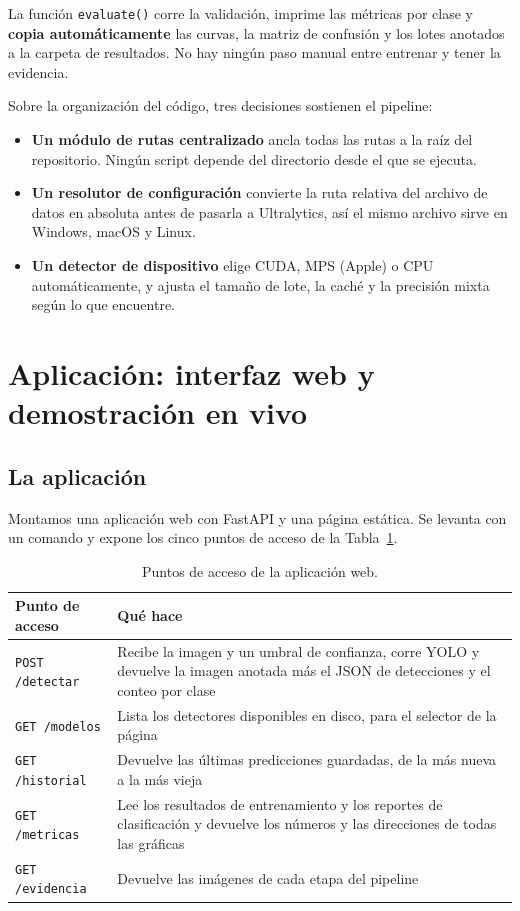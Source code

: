 \documentclass[11pt,a4paper]{article}
\begin{document}
La función \texttt{evaluate()} corre la validación, imprime las métricas por clase y \textbf{copia
automáticamente} las curvas, la matriz de confusión y los lotes anotados a la carpeta de
resultados. No hay ningún paso manual entre entrenar y tener la evidencia.

Sobre la organización del código, tres decisiones sostienen el pipeline:

\begin{itemize}
  \item \textbf{Un módulo de rutas centralizado} ancla todas las rutas a la raíz del repositorio.
        Ningún script depende del directorio desde el que se ejecuta.
  \item \textbf{Un resolutor de configuración} convierte la ruta relativa del archivo de datos en
        absoluta antes de pasarla a Ultralytics, así el mismo archivo sirve en Windows, macOS y
        Linux.
  \item \textbf{Un detector de dispositivo} elige CUDA, MPS (Apple) o CPU automáticamente, y ajusta
        el tamaño de lote, la caché y la precisión mixta según lo que encuentre.
\end{itemize}

\section{Aplicación: interfaz web y demostración en vivo}
\label{sec:aplicacion}

\subsection{La aplicación}

Montamos una aplicación web con FastAPI y una página estática. Se levanta con un comando y expone
los cinco puntos de acceso de la Tabla~\ref{tab:endpoints}.

\begin{table}[htbp]
\centering
\caption{Puntos de acceso de la aplicación web.}
\label{tab:endpoints}
\small
\begin{tabularx}{\textwidth}{@{}l X@{}}
\toprule
\textbf{Punto de acceso} & \textbf{Qué hace} \\
\midrule
\texttt{POST /detectar} & Recibe la imagen y un umbral de confianza, corre YOLO y devuelve la imagen anotada más el JSON de detecciones y el conteo por clase \\
\texttt{GET /modelos} & Lista los detectores disponibles en disco, para el selector de la página \\
\texttt{GET /historial} & Devuelve las últimas predicciones guardadas, de la más nueva a la más vieja \\
\texttt{GET /metricas} & Lee los resultados de entrenamiento y los reportes de clasificación y devuelve los números y las direcciones de todas las gráficas \\
\texttt{GET /evidencia} & Devuelve las imágenes de cada etapa del pipeline \\
\bottomrule
\end{tabularx}
\end{table}
\end{document}
